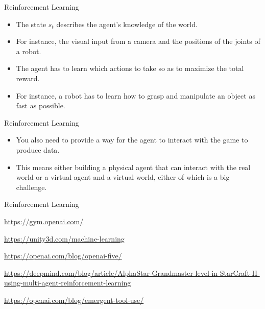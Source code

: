 \documentclass{beamer}
\begin{document}

\begin{frame}{Reinforcement Learning}

\begin{itemize}
\item The state $s_t$ describes the agent's knowledge of the world. 

\item For instance, the visual input from a camera and the positions of the joints of a robot.

\item The agent has to learn which actions to take so as to maximize the total reward.  

\item For instance, a robot has to learn how to grasp and manipulate an object as fast as possible.
\end{itemize}

\end{frame}





\begin{frame}{Reinforcement Learning}

\begin{itemize} 
\item You also need to provide a way for the agent to interact with the game to produce data.

\item This means either building a physical agent that can interact with the real world or a virtual agent and a virtual world, either of which is a big challenge. 

\end{itemize}

\end{frame}


\begin{frame}{Reinforcement Learning}

\url{https://gym.openai.com/}

\url{https://unity3d.com/machine-learning}

\url{https://openai.com/blog/openai-five/}

{\tiny
\url{https://deepmind.com/blog/article/AlphaStar-Grandmaster-level-in-StarCraft-II-using-multi-agent-reinforcement-learning}
}

\url{https://openai.com/blog/emergent-tool-use/}

\end{frame}
\end{document}

